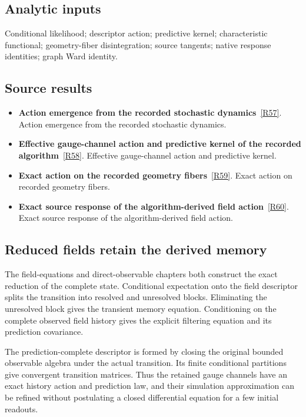 \documentclass[11pt,a4paper]{article}
\begin{document}
\subsection*{Analytic inputs}
Conditional likelihood; descriptor action; predictive kernel; characteristic functional; geometry-fiber disintegration; source tangents; native response identities; graph Ward identity.
\subsection*{Source results}
\begin{itemize}
\item \textbf{Action emergence from the recorded stochastic dynamics}~\hyperref[src:thm-ym-recorded-action-emergence]{[R57]}. Action emergence from the recorded stochastic dynamics.
\item \textbf{Effective gauge-channel action and predictive kernel of the recorded algorithm}~\hyperref[src:thm-sm-effective-recorded-gauge-dynamics]{[R58]}. Effective gauge-channel action and predictive kernel.
\item \textbf{Exact action on the recorded geometry fibers}~\hyperref[src:thm-ym-native-geometry-fiber-action]{[R59]}. Exact action on recorded geometry fibers.
\item \textbf{Exact source response of the algorithm-derived field action}~\hyperref[src:thm-ym-native-source-response]{[R60]}. Exact source response of the algorithm-derived field action.
\end{itemize}
\subsection*{Reduced fields retain the derived memory}
The field-equations and direct-observable chapters both construct the exact reduction of the complete state. Conditional expectation onto the field descriptor splits the transition into resolved and unresolved blocks. Eliminating the unresolved block gives the transient memory equation. Conditioning on the complete observed field history gives the explicit filtering equation and its prediction covariance.

The prediction-complete descriptor is formed by closing the original bounded observable algebra under the actual transition. Its finite conditional partitions give convergent transition matrices. Thus the retained gauge channels have an exact history action and prediction law, and their simulation approximation can be refined without postulating a closed differential equation for a few initial readouts.
\end{document}
